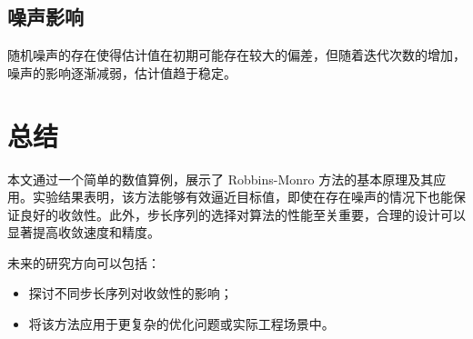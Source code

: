 \documentclass{article}
\begin{document}
\subsection{噪声影响}
随机噪声的存在使得估计值在初期可能存在较大的偏差，但随着迭代次数的增加，噪声的影响逐渐减弱，估计值趋于稳定。

\section{总结}
本文通过一个简单的数值算例，展示了 Robbins-Monro 方法的基本原理及其应用。实验结果表明，该方法能够有效逼近目标值，即使在存在噪声的情况下也能保证良好的收敛性。此外，步长序列的选择对算法的性能至关重要，合理的设计可以显著提高收敛速度和精度。

未来的研究方向可以包括：
\begin{itemize}
    \item 探讨不同步长序列对收敛性的影响；
    \item 将该方法应用于更复杂的优化问题或实际工程场景中。
\end{itemize}
\end{document}
